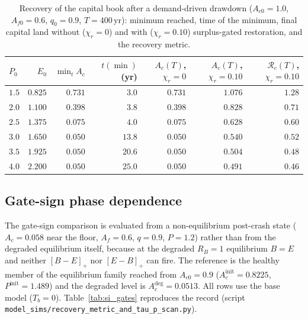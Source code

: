 \documentclass[11pt,a4paper]{article}
\newcommand{\pos}[1]{\left[#1\right]_+}
\begin{document}
\begin{table}[htbp]
\centering\small
\caption{Recovery of the capital book after a demand-driven drawdown ($A_{c0}=1.0$, $A_{f0}=0.6$, $q_0=0.9$, $T=400$\,yr): minimum reached, time of the minimum, final capital land without ($\chi_r=0$) and with ($\chi_r=0.10$) surplus-gated restoration, and the recovery metric.}
\label{tab:si_recovery}
\begin{tabular}{l r r r r r r}
\toprule
$P_0$ & $E_0$ & $\min_tA_c$ & $t(\min)$ (yr) & $A_c(T)$, $\chi_r=0$ & $A_c(T)$, $\chi_r=0.10$ & $\mathcal R_c(T)$, $\chi_r=0.10$ \\
\midrule
$1.5$ & $0.825$ & $0.731$ & $3.0$ & $0.731$ & $1.076$ & $1.28$ \\
$2.0$ & $1.100$ & $0.398$ & $3.8$ & $0.398$ & $0.828$ & $0.71$ \\
$2.5$ & $1.375$ & $0.075$ & $4.0$ & $0.075$ & $0.628$ & $0.60$ \\
$3.0$ & $1.650$ & $0.050$ & $13.8$ & $0.050$ & $0.540$ & $0.52$ \\
$3.5$ & $1.925$ & $0.050$ & $20.6$ & $0.050$ & $0.504$ & $0.48$ \\
$4.0$ & $2.200$ & $0.050$ & $25.0$ & $0.050$ & $0.491$ & $0.46$ \\
\bottomrule
\end{tabular}
\end{table}

\subsection{Gate-sign phase dependence}\label{si:gates}

The gate-sign comparison is evaluated from a non-equilibrium post-crash state ($A_c=0.058$ near the floor, $A_f=0.6$, $q=0.9$, $P=1.2$) rather than from the degraded equilibrium itself, because at the degraded $R_B=1$ equilibrium $B=E$ and neither $\pos{B-E}$ nor $\pos{E-B}$ can fire. The reference is the healthy member of the equilibrium family reached from $A_{c0}=0.9$ ($A_c^{\mathrm{init}}=0.8225$, $P^{\mathrm{init}}=1.489$) and the degraded level is $A_c^{\mathrm{deg}}=0.0513$. All rows use the base model ($T_b=0$). Table~\ref{tab:si_gates} reproduces the record (script \texttt{model\_sims/recovery\_metric\_and\_tau\_p\_scan.py}).
\end{document}
